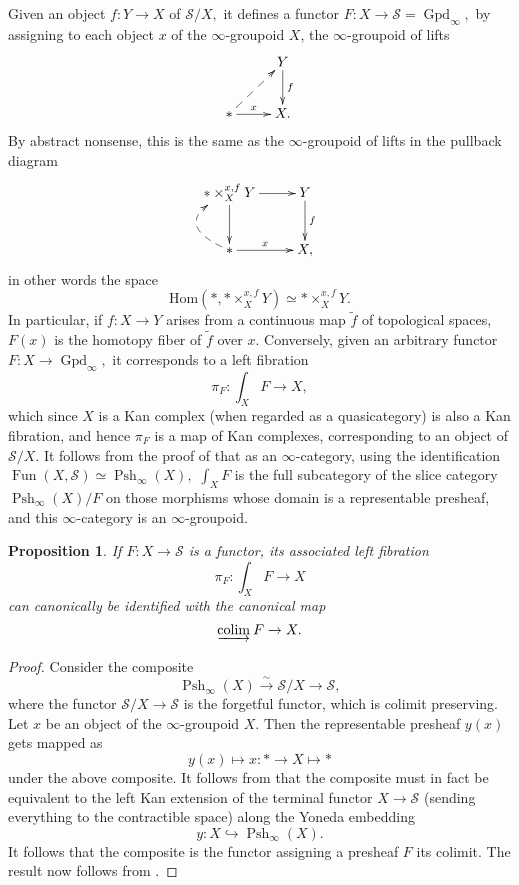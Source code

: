\documentclass[12pt]{amsart}
\newtheorem{proposition}[dummy]{Proposition}
\theoremstyle{definition}
\newcommand{\cS}{\mathcal{S}}
\newcommand{\Hom}{\mathrm{Hom}}
\renewcommand{\i}{\infty}
\def\iGpd{\operatorname{Gpd}_\i}
\def\Fun{\operatorname{Fun}}
\def\Pshi{\operatorname{Psh}_\i}
\def\colim{\underrightarrow{\mbox{colim}\vspace{0.5pt}}\mspace{4mu}}
\begin{document}
Given an object $f:Y \to X$ of $\cS/X,$ it defines a functor $F:X \to \cS=\iGpd,$ by assigning to each object $x$ of the $\i$-groupoid $X$, the $\i$-groupoid of lifts
$$\xymatrix{& Y \ar[d]^-{f}\\
\ast \ar@{-->}[ur] \ar[r]^-{x} & X.}$$ By abstract nonsense, this is the same as the $\i$-groupoid of lifts in the pullback diagram
$$\xymatrix{\ast \times^{x,f}_{X} Y \ar[r] \ar[d]& Y \ar[d]^-{f}\\
\ast \ar@/^2pc/@{-->}[u] \ar[r]^-{x} & X,}$$
in other words the space $$\Hom\left(*,\ast \times^{x,f}_{X} Y\right) \simeq \ast \times^{x,f}_{X} Y.$$ In particular, if $f:X \to Y$ arises from a continuous map $\tilde f$ of topological spaces, $F\left(x\right)$ is the homotopy fiber of $\tilde f$ over $x.$ Conversely, given an arbitrary functor $F:X \to \iGpd,$ it corresponds to a left fibration $$\pi_F:\int_X F \to X,$$ which since $X$ is a Kan complex (when regarded as a quasicategory) is also a Kan fibration, and hence $\pi_F$ is a map of Kan complexes, corresponding to an object of $\cS/X.$ It follows from the proof of \cite[Corollary 5.3.5.4]{htt} that as an $\i$-category, using the identification $\Fun\left(X,\cS\right)\simeq \Pshi\left(X\right),$ $\int_X F$ is the full subcategory of the slice category $\Pshi\left(X\right)/F$ on those morphisms whose domain is a representable presheaf, and this $\i$-category is an $\i$-groupoid.

\begin{proposition}\label{prop:colim}
If $F:X \to \cS$ is a functor, its associated left fibration $$\pi_F:\int_X F \to X$$ can canonically be identified with the canonical map $$\colim F \to X.$$
\end{proposition}

\begin{proof}
Consider the composite $$\Pshi\left(X\right) \stackrel{\sim}{\longrightarrow} \cS/X \to \cS,$$ where the functor $\cS/X \to \cS$ is the forgetful functor, which is colimit preserving. Let $x$ be an object of the $\i$-groupoid $X.$ Then the representable presheaf $y\left(x\right)$ gets mapped as
$$y\left(x\right) \mapsto x:* \to X \mapsto *$$ under the above composite. It follows from \cite[Theorem 5.1.5.6]{htt} that the composite must in fact be equivalent to the left Kan extension of the terminal functor $X \to \cS$ (sending everything to the contractible space) along the Yoneda embedding $$y:X \hookrightarrow \Pshi\left(X\right).$$ It follows that the composite is the functor assigning a presheaf $F$ its colimit. The result now follows from \cite[Proposition 1.2.13.8]{htt}.
\end{proof}
\end{document}
